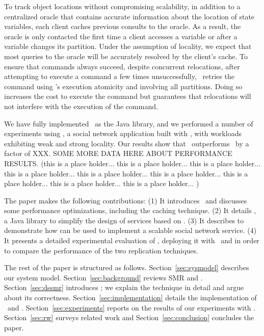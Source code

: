 To track object locations without compromising scalability, in addition to a centralized oracle that contains accurate information about the location of state variables, each client caches previous consults to the oracle.
As a result, the oracle is only contacted the first time a client accesses a variable or after a variable changes its partition.
Under the assumption of locality, we expect that most queries to the oracle will be accurately resolved by the client's cache.
To ensure that commands always succeed, despite concurrent relocations, after attempting to execute a command a few times unsuccessfully, \dssmr\ retries the command using \ssmr{}'s execution atomicity and involving all partitions. 
Doing so increases the cost to execute the command but guarantees that relocations will not interfere with the execution of the command.

We have fully implemented \dssmr\ as the \libname{} Java library, and we performed a number of experiments using \appname{}, a social network application built with \libname{}, with workloads exhibiting weak and strong locality.
Our results show that \dssmr\ outperforms \ssmr\ by a factor of XXX. SOME MORE DATA HERE ABOUT PERFORMANCE RESULTS. (this is a place holder... this is a place holder... this is a place holder... this is a place holder... this is a place holder... this is a place holder... this is a place holder... this is a place holder... this is a place holder... )

The paper makes the following contributions:
(1) It introduces \dssmr\ and discusses some performance optimizations, including the caching technique. 
(2) It details \libname{}, a Java library to simplify the design of services based on \dssmr{}.
(3) It describes \appname{} to demonstrate how \libname{} can be used to implement a scalable social network service.
(4) It presents a detailed experimental evaluation of \appname{}, deploying it with \ssmr\ and \dssmr{} in order to compare the performance of the two replication techniques.

The rest of the paper is structured as follows.
Section~\ref{sec:sysmodel} describes our system model.
Section~\ref{sec:background} reviews SMR and \ssmrshort{}.
Section~\ref{sec:dssmr} introduces \dssmr{}; we explain the technique in detail and argue about its correctness.
Section~\ref{sec:implementation} details the implementation of \libname\ and \appname{}.
Section~\ref{sec:experiments} reports on the results of our experiments with \dssmr{}.
Section~\ref{sec:rw} surveys related work and
Section~\ref{sec:conclusion} concludes the paper.





